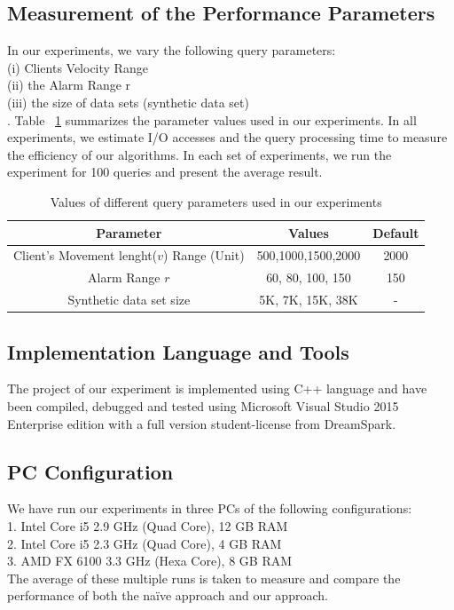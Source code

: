 \subsection{Measurement of the Performance Parameters}
In our experiments, we vary the following query parameters:\\ (i) Clients Velocity Range\\ (ii) the Alarm Range r\\ (iii) the size of data sets (synthetic data set)\\. Table ~\ref{table:exp_setup} summarizes the parameter values used in our experiments. In all experiments, we estimate I/O accesses and the query processing time to measure the efficiency of our algorithms. In each set of experiments, we run the experiment for 100 queries and present the average result.
\vspace*{10pt}
\begin{table}[htbp]
  \centering

\begin{tabular}{|c|c|c|}  \hline
  Parameter& Values & Default\\
  \hline
  Client’s Movement lenght($ v $) Range (Unit) & 500,1000,1500,2000 &2000 \\
  \hline
  Alarm Range $r$& 60, 80, 100, 150 &150\\
  \hline
  Synthetic data set size & 5K, 7K, 15K, 38K & - \\
  \hline
\end{tabular}
\caption{Values of different query parameters used in our experiments} \label{table:exp_setup} \vspace{-2mm}
\end{table}


\subsection{Implementation Language and Tools}
The project of our experiment is implemented using C++ language and have been compiled, debugged and tested using Microsoft Visual Studio 2015 Enterprise edition with a full version student-license from DreamSpark.

\subsection{PC Configuration}
We have run our experiments in three PCs of the following configurations:\\
1. Intel Core i5 2.9 GHz (Quad Core), 12 GB RAM \\
2. Intel Core i5 2.3 GHz (Quad Core), 4 GB RAM \\
3. AMD FX 6100 3.3 GHz (Hexa Core), 8 GB RAM \\
The average of these multiple runs is taken to measure and compare the performance of both the naïve approach and our approach.



